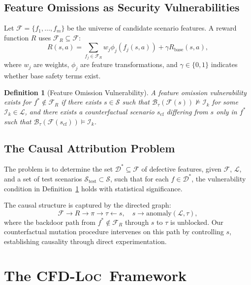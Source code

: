 \documentclass[journal]{IEEEtran}
\theoremstyle{plain}
\newtheorem{definition}{Definition}[section]
\newcommand{\methodname}{\textsc{CFD-Loc}}
\newcommand{\invlib}{\mathcal{L}}
\newcommand{\sys}{\mathcal{F}}
\newcommand{\beh}{\mathcal{B}}
\begin{document}
\subsection{Feature Omissions as Security Vulnerabilities}

Let $\mathcal{F} = \{f_1,\dots,f_m\}$ be the universe of candidate scenario features. A reward function $R$ uses $\mathcal{F}_R \subseteq \mathcal{F}$:
\begin{equation}
R(s,a) = \sum_{f_j \in \mathcal{F}_R} w_j \phi_j(f_j(s,a)) + \gamma R_{\text{base}}(s,a),
\end{equation}
where $w_j$ are weights, $\phi_j$ are feature transformations, and $\gamma \in \{0,1\}$ indicates whether base safety terms exist.

\begin{definition}[Feature Omission Vulnerability]\label{def:omission}
A feature omission vulnerability exists for $f^* \notin \mathcal{F}_R$ if there exists $s \in \mathcal{S}$ such that $\beh_{\tau}(\sys(s)) \not\models \mathcal{I}_k$ for some $\mathcal{I}_k \in \invlib$, and there exists a counterfactual scenario $s_{\text{cf}}$ differing from $s$ only in $f^*$ such that $\beh_{\tau}(\sys(s_{\text{cf}})) \models \mathcal{I}_k$.
\end{definition}

\subsection{The Causal Attribution Problem}

The problem is to determine the set $\mathcal{D}^* \subseteq \mathcal{F}$ of defective features, given $\sys$, $\invlib$, and a set of test scenarios $\mathcal{S}_{\text{test}} \subset \mathcal{S}$, such that for each $f \in \mathcal{D}^*$, the vulnerability condition in Definition~\ref{def:omission} holds with statistical significance.

The causal structure is captured by the directed graph:
\begin{equation}
\mathcal{F} \to R \to \pi \to \tau \leftarrow s, \quad s \to \text{anomaly}(\invlib, \tau),
\end{equation}
where the backdoor path from $f^* \notin \mathcal{F}_R$ through $s$ to $\tau$ is unblocked. Our counterfactual mutation procedure intervenes on this path by controlling $s$, establishing causality through direct experimentation.

\section{The \methodname\ Framework}
\end{document}
